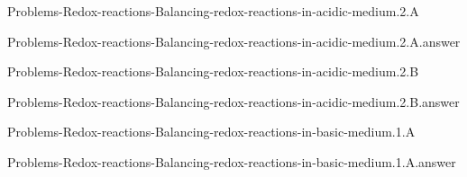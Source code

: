 \documentclass[main.tex]{subfiles}
\newcommand\chapterlabel{}
\begin{document}
\renewcommand\chapterlabel{Ch-electrolytes}
\begin{question}[ID=\the\value{numA}]
{Problems-Redox-reactions-Balancing-redox-reactions-in-acidic-medium.2.A}
\end{question}
   \begin{Form}
   \TextField[multiline,backgroundcolor=gray!20,borderwidth=0,width=0.43\textwidth  ,height=115pt, name=\the\value{numA}]  { }\end{Form}
\begin{solution}
{Problems-Redox-reactions-Balancing-redox-reactions-in-acidic-medium.2.A.answer}
\hspace{0.1cm}
\end{solution}


\renewcommand\chapterlabel{Ch-electrolytes}
\begin{question}[ID=\the\value{numA}]
{Problems-Redox-reactions-Balancing-redox-reactions-in-acidic-medium.2.B}
\end{question}
   \begin{Form}
   \TextField[multiline,backgroundcolor=gray!20,borderwidth=0,width=0.43\textwidth  ,height=115pt, name=\the\value{numA}]  { }\end{Form}
\begin{solution}
{Problems-Redox-reactions-Balancing-redox-reactions-in-acidic-medium.2.B.answer}
\hspace{0.1cm}
\end{solution}


\renewcommand\chapterlabel{Ch-electrolytes}
\begin{question}[ID=\the\value{numA}]
{Problems-Redox-reactions-Balancing-redox-reactions-in-basic-medium.1.A}
\end{question}
   \begin{Form}
   \TextField[multiline,backgroundcolor=gray!20,borderwidth=0,width=0.43\textwidth  ,height=115pt, name=\the\value{numA}]  { }\end{Form}
\begin{solution}
{Problems-Redox-reactions-Balancing-redox-reactions-in-basic-medium.1.A.answer}
\hspace{0.1cm}
\end{solution}
\end{document}
